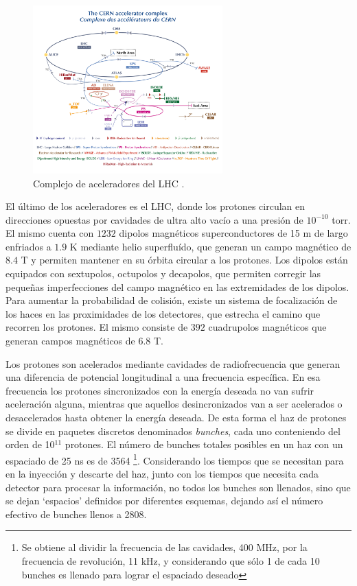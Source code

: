 \begin{figure}
  \centering
  \includegraphics[width=0.65\textwidth]{images/lhc/LHC_complex.png}
  \caption{Complejo de aceleradores del LHC \cite{Lopienska:2800984}.}
  \label{LHC_complex}
\end{figure}

El último de los aceleradores es el LHC, donde los protones circulan en direcciones opuestas por cavidades de ultra alto vacío a una presión de $10^{-10}$ torr. El mismo cuenta con $1232$ dipolos magnéticos superconductores de 15 m de largo enfriados a $1.9$ K mediante helio superfluído, que generan un campo magnético de $8.4$ T y permiten mantener en su órbita circular a los protones. Los dipolos están equipados con sextupolos, octupolos y decapolos, que permiten corregir las pequeñas imperfecciones del campo magnético en las extremidades de los dipolos. Para aumentar la probabilidad de colisión, existe un sistema de focalización de los haces en las proximidades de los detectores, que estrecha el camino que recorren los protones. El mismo consiste de $392$ cuadrupolos magnéticos que generan campos magnéticos de $6.8$ T. 

Los protones son acelerados mediante cavidades de radiofrecuencia que generan una diferencia de potencial longitudinal a una frecuencia específica. En esa frecuencia los protones sincronizados con la energía deseada no van sufrir aceleración alguna, mientras que aquellos desincronizados van a ser acelerados o desacelerados hasta obtener la energía deseada. De esta forma el haz de protones se divide en paquetes discretos denominados \textit{bunches}, cada uno conteniendo del orden de 10$^{11}$ protones. El número de bunches totales posibles en un haz con un espaciado de 25 ns es de 3564 \footnote{Se obtiene al dividir la frecuencia de las cavidades, 400 MHz, por la frecuencia de revolución, 11 kHz, y considerando que sólo 1 de cada 10 bunches es llenado para lograr el espaciado deseado}. Considerando los tiempos que se necesitan para en la inyección y descarte del haz, junto con los tiempos que necesita cada detector para procesar la información, no todos los bunches son llenados, sino que se dejan `espacios' definidos por diferentes esquemas, dejando así el número efectivo de bunches llenos a 2808.

